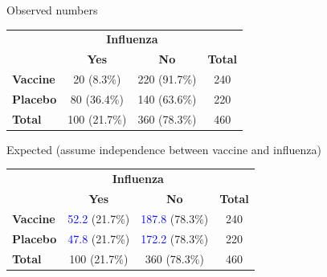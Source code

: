 \documentclass[compress, notes=hide]{beamer}
\begin{document}
\begin{frame}
	\begin{block}{Observed numbers}
				\begin{table}
			\begin{small}
				\begin{tabular}{lccc}
					\hline
					& \multicolumn{2}{c}{\textbf{Influenza}} &
					\\
					\cline{2-3}
					& \textbf{Yes} & \textbf{No} & \textbf{Total}
					\\
					\hline
					\textbf{Vaccine} & 20 (8.3\%) & 220 (91.7\%) & 240
					\\
					\textbf{Placebo} & 80 (36.4\%) & 140 (63.6\%) & 220
					\\
					\hline
					\textbf{Total} & 100 (21.7\%) & 360 (78.3\%) & 460
					\\
					\hline
				\end{tabular}
			\end{small}
		\end{table}
		
	\end{block}
	\begin{block}{Expected (assume independence between vaccine and influenza)}
	\begin{table}
		\begin{small}
			\begin{tabular}{lccc}
				\hline
				& \multicolumn{2}{c}{\textbf{Influenza}} &
				\\
				\cline{2-3}
				& \textbf{Yes} & \textbf{No} & \textbf{Total}
				\\
				\hline
				\textbf{Vaccine} & \textcolor{blue}{52.2} (21.7\%) & \textcolor{blue}{187.8} (78.3\%) & 240
				\\
				\textbf{Placebo} & \textcolor{blue}{47.8} (21.7\%) & \textcolor{blue}{172.2} (78.3\%) & 220
				\\
				\hline
				\textbf{Total} & 100 (21.7\%) & 360 (78.3\%) & 460
				\\
				\hline
			\end{tabular}
		\end{small}
	\end{table}
	
\end{block}

\end{frame}
\end{document}
